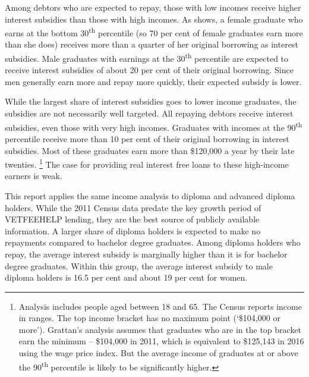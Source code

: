 \documentclass[embargoed]{grattan}
\begin{document}
{\begin{figure}
\end{figure}

Among debtors who are expected to repay, those with low incomes receive higher interest subsidies than those with high incomes.
As  shows, a female graduate who earns at the bottom 30\textsuperscript{th} percentile (so 70 per cent of female graduates earn more than she does) receives more than a quarter of her original borrowing as interest subsidies.
Male graduates with earnings at the 30\textsuperscript{th} percentile are expected to receive interest subsidies of about 20 per cent of their original borrowing.
Since men generally earn more and repay more quickly, their expected subsidy is lower.

While the largest share of interest subsidies goes to lower income graduates, the subsidies are not necessarily well targeted.
All repaying debtors receive interest subsidies, even those with very high incomes.
Graduates with incomes at the 90\textsuperscript{th} percentile receive more than 10 per cent of their original borrowing in interest subsidies.
Most of these graduates earn more than \$120,000 a year by their late twenties.%
\footnote{Analysis includes people aged between 18 and 65.
The Census reports income in ranges.
The top income bracket has no maximum point (`\$104,000 or more').
Grattan's analysis assumes that graduates who are in the top bracket earn the minimum -- \$104,000 in 2011, which is equivalent to \$125,143 in 2016 using the wage price index.
But the average income of graduates at or above the 90\textsuperscript{th} percentile is likely to be significantly higher.} The case for providing real interest free loans to these high-income earners is weak.

\protect\hypertarget{_Ref312571851}{}{}This report applies the same income analysis to diploma and advanced diploma holders.
While the 2011 Census data predate the key growth period of \gls{VETFEEHELP} lending, they are the best source of publicly available information.
A larger share of diploma holders is expected to make no repayments compared to bachelor degree graduates.
Among diploma holders who repay, the average interest subsidy is marginally higher than it is for bachelor degree graduates.
Within this group, the average interest subsidy to male diploma holders is 16.5 per cent and about 19 per cent for women.

}
\end{document}
